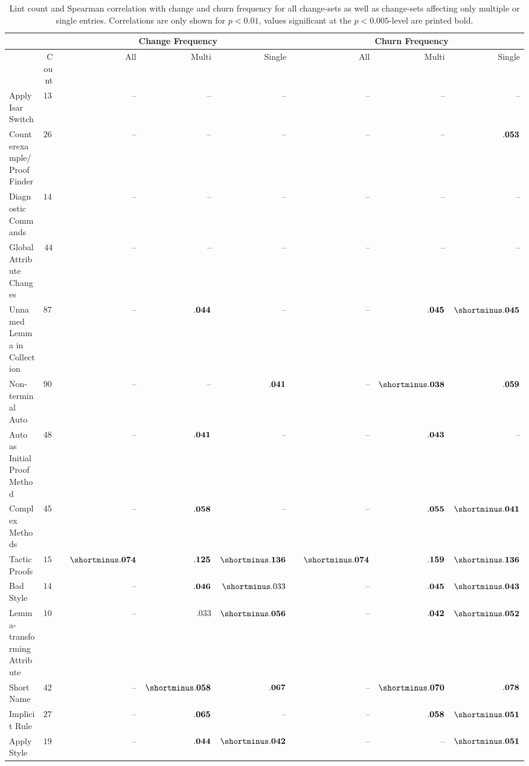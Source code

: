 \begin{table}[!htbp]
    \centering
    \caption{
Lint count and Spearman correlation with change and churn frequency
for all change-sets as well as change-sets affecting only multiple or single entries.
Correlations are only shown for $p<0.01$, values significant at the $p<0.005$-level are printed bold.
}
    \label{tab:lint_change_cor}
\begin{tabular}{@{}lrcrrrcrrr@{}}
\toprule
                             & & \multicolumn{1}{l}{}      & \multicolumn{3}{c}{Change Frequency}              &                                             & \multicolumn{3}{c}{Churn Frequency}                                                                     \\ \midrule
                             & \multicolumn{1}{r}{Count} & & \multicolumn{1}{r}{All} & \multicolumn{1}{r}{Multi} & \multicolumn{1}{r}{Single} & & \multicolumn{1}{r}{All} & \multicolumn{1}{r}{Multi} & \multicolumn{1}{r}{Single}
\\Apply Isar Switch            & $1366$ & &
-- & -- & -- & & -- & -- & --
\\Counterexample/Proof Finder  & $263$ & &
-- & -- & -- & & -- & -- & $\bf{.053}$
\\Diagnostic Commands          & $1426$ & &
-- & -- & -- & & -- & -- & --
\\Global Attribute Changes     & $44$ & &
-- & -- & -- & & -- & -- & --
\\Unnamed Lemma in Collection  & $872$ & &
-- & $\bf{.044}$ & -- & & -- & $\bf{.045}$ & $\bf{\shortminus .045}$
\\Non-terminal Auto            & $9087$ & &
-- & -- & $\bf{.041}$ & & -- & $\bf{\shortminus .038}$ & $\bf{.059}$
\\Auto as Initial Proof Method & $4863$ & &
-- & $\bf{.041}$ & -- & & -- & $\bf{.043}$ & --
\\Complex Methods              & $4585$ & &
-- & $\bf{.058}$ & -- & & -- & $\bf{.055}$ & $\bf{\shortminus .041}$
\\Tactic Proofs                & $15338$ & &
$\bf{\shortminus .074}$ & $\bf{.125}$ & $\bf{\shortminus .136}$ & & $\bf{\shortminus .074}$ & $\bf{.159}$ & $\bf{\shortminus .136}$
\\ \midrule Bad Style & $140$ & &
-- & $\bf{.046}$ & $\shortminus .033$ & & -- & $\bf{.045}$ & $\bf{\shortminus .043}$
\\ Lemma-transforming Attribute & $1015$ & &
-- & $.033$ & $\bf{\shortminus .056}$ & & -- & $\bf{.042}$ & $\bf{\shortminus .052}$
\\ Short Name & $425$ & &
-- & $\bf{\shortminus .058}$ & $\bf{.067}$ & & -- & $\bf{\shortminus .070}$ & $\bf{.078}$
\\ Implicit Rule & $2735$ & &
-- & $\bf{.065}$ & -- & & -- & $\bf{.058}$ & $\bf{\shortminus .051}$
\\ Apply Style & $190838$ & &
-- & $\bf{.044}$ & $\bf{\shortminus .042}$ & & -- & -- & $\bf{\shortminus .051}$
\\ \bottomrule
\end{tabular}
\end{table}